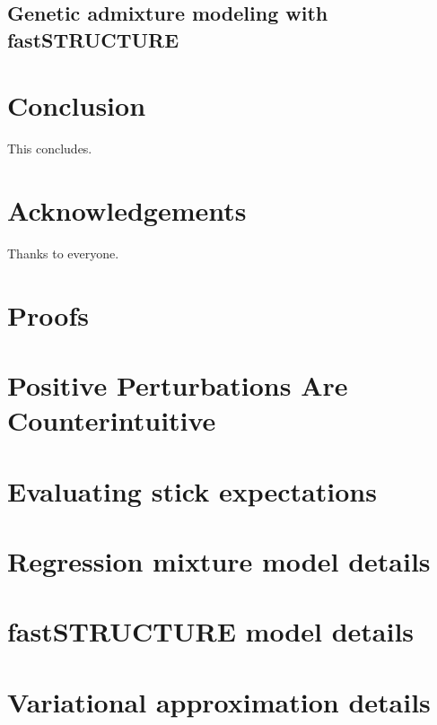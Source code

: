 \documentclass[11pt]{article}
\begin{document}
    \subsection{Genetic admixture modeling with fastSTRUCTURE}
    

\section{Conclusion}
This concludes.

% 



\section{Acknowledgements}
Thanks to everyone.






\clearpage
\newpage

\appendix

\section*{Proofs}



\section*{Positive Perturbations Are Counterintuitive}


\section{Evaluating stick expectations}


\section{Regression mixture model details}


\section{fastSTRUCTURE model details}


\section{Variational approximation details}
\end{document}
